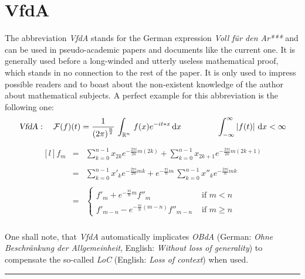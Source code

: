 \documentclass[pdftex,12pt,a4paper]{report}
\begin{document}
    \section{VfdA}
    The abbreviation \emph{VfdA} stands for the German expression \emph{Voll für den Ar***} and can be used in pseudo-academic papers and documents like the current one. It is generally used before a long-winded and utterly useless mathematical proof, which stands in no connection to the rest of the paper. It is only used to impress possible readers and to boast about the non-existent knowledge of the author about mathematical subjects. A perfect example for this abbreviation is the following one:
    \\
    \medskip
    \begin{equation*}
        \begin{aligned}
            \textsl{VfdA}: \quad \mathcal{F}(f)(t) = \frac{1}{\left( 2 \pi \right)^\frac{n}{2}} \, \int_{\mathbb{R}^n} \, f(x)e^{-it*x} \, \mathrm{d}x
            \qquad
            \qquad
            \ 
            \int_{-\infty}^{\infty} \left| f(t) \right| \, \mathrm{d}x < \infty
        \end{aligned}
    \end{equation*}
    \begin{equation*}
        \begin{aligned}
            \begin{matrix*}[l]
                f_m & = & \sum_{k=0}^{n-1} x_{2k} e^{- \frac{2 \pi i}{2 n} m (2k)} + \sum_{k=0}^{n-1} x_{2k + 1} e^{- \frac{2 \pi i}{2 n} m (2k + 1)}
                \\  &   &
                \\  & = & \sum_{k=0}^{n-1} x'_k e^{- \frac{2 \pi i}{2 n} mk} + e^{-\frac{\pi i}{n} m} \, \sum_{k=0}^{n-1} x''_k e^{- \frac{2 \pi i}{n} mk}
                \\  &   &
                \\  & = &
                \begin{cases}
                    f'_m + e^{- \frac{\pi i}{n} m} f''_m             & \text{ if } m < n \\
                    f'_{m-n} - e^{- \frac{\pi i}{n} (m-n)} f''_{m-n} & \text{ if } m \geq n
                \end{cases}
            \end{matrix*}
        \end{aligned}
    \end{equation*}
    \vspace{2mm}
    \\
    One shall note, that \emph{VfdA} automatically implicates \emph{OBdA} (German: \emph{Ohne Beschränkung der Allgemeinheit}, English: \emph{Without loss of generality}) to compensate the so-called \emph{LoC} (English: \emph{Loss of context}) when used.
    \vspace{5mm} \hrule \vspace{5mm}
\end{document}
